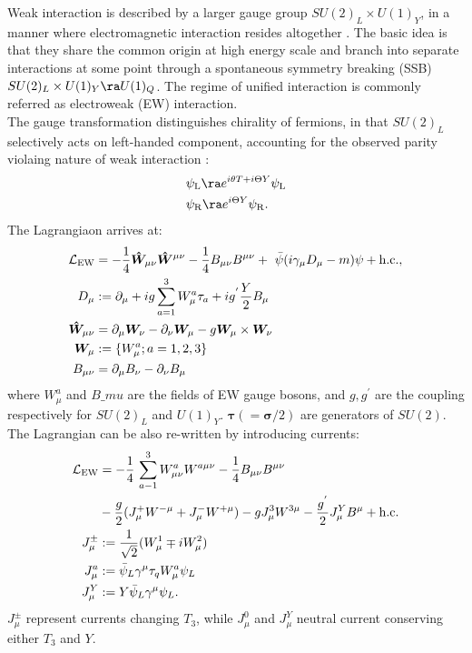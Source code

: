 Weak interaction is described by a larger gauge group $SU(2)_L \times U(1)_Y$, in a manner where electromagnetic interaction resides altogether \cite{WeakGlashow} \cite{WeakWeinberg} \cite{WeakSalam}. 
The basic idea is that they share the common origin at high energy scale and branch into separate interactions at some point through a spontaneous symmetry breaking (SSB) $SU(2)_L \times U(1)_Y \ra U(1)_Q$.
The regime of unified interaction is commonly referred as electroweak (EW) interaction. \\

The gauge transformation distinguishes chirality of fermions, in that $SU(2)_L$ selectively acts on left-handed component, accounting for the observed parity violaing nature of weak interaction \cite{PVLeeYang} \cite{PVWu}:
\begin{align}
& \psi_{\mL} \ra e^{i\theta T+i\Theta Y} \psi_{\mL}   \\
& \psi_{\mR} \ra e^{i\Theta Y} \psi_{\mR}.
\end{align}
The Lagrangiaon arrives at:
\begin{align}
\mathcal{L}_{\mathrm{EW}} & = -\frac{1}{4} \bm{\hat{W}}_{\mu\nu} \bm{\hat{W}}^{\mu\nu}-\frac{1}{4}B_{\mu\nu} B^{\mu\nu} + \,\, \bar{\psi}(i \gamma_\mu D_\mu - m) \psi + \mathrm{h.c.}, \nn \\
%
D_\mu & := \partial_\mu + ig \sum_{a=1}^3 W^a_{\mu} \tau_a  + ig^{'} \frac{Y}{2} B_\mu \nn \\
\bm{\hat{W}}_{\mu\nu} & = \partial_\mu \bm{W}_\nu - \partial_\nu \bm{W}_\mu - g \bm{W}_\mu \times \bm{W}_\nu \nn \\
\bm{W}_\mu & := \{W^a_\mu; a=1,2,3\} \nn \\
B_{\mu\nu} & = \partial_\mu B_\nu - \partial_\nu B_\mu
\label{eq::EWLag1}
\end{align}
where $W^a_\mu$ and $B\_mu$ are the fields of EW gauge bosons, and $g, g^{'}$ are the coupling respectively for $SU(2)_L$ and $U(1)_Y$. $\bm{\tau} (= \bm{\sigma}/2)$ are generators of $SU(2)$. \\

The Lagrangian can be also re-written by introducing currents:
\begin{align}
\mathcal{L}_{\mathrm{EW}} & = -\frac{1}{4} \, \sum_{a-1}^3 W^a_{\mu\nu} W^{a\mu\nu}-\frac{1}{4}B_{\mu\nu} B^{\mu\nu} \nonumber \\
& -\frac{g}{2} (J_\mu^+ W^{-\mu} + J_\mu^- W^{+\mu}) -g J_\mu^3 W^{3\mu} - \frac{g^{'}}{2}J_\mu^YB^\mu  + \mathrm{h.c.}  \nonumber \\
 J^{\pm}_\mu & := \frac{1}{\sqrt{2}} (W_\mu^1\mp iW_\mu^2) \nonumber \\
 J^a_\mu & := \bar{\psi}_L \gamma^\mu \tau_q W_\mu^a \psi_L \nonumber \\
 J^Y_\mu & := Y \bar{\psi}_L \gamma^\mu  \psi_L.
\label{eq::EWLag2}
\end{align}
$J_\mu^\pm$ represent currents changing $T_3$, while $J_\mu^0$ and $J_\mu^Y$ neutral current conserving either $T_3$ and $Y$. \\

